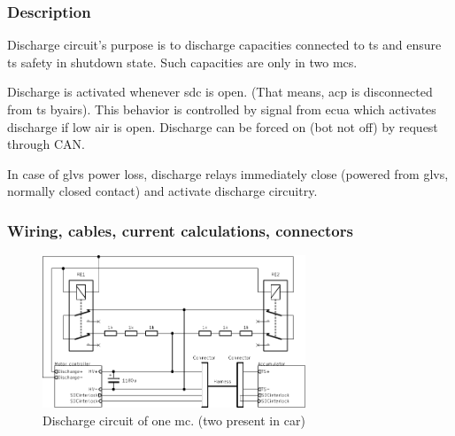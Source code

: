 \subsubsection{Description}

Discharge circuit's purpose is to discharge capacities connected to \gls{ts} and ensure \gls{ts} safety in shutdown state. Such capacities are only in two \glspl{mc}.

Discharge is activated whenever \gls{sdc} is open. (That means, \gls{acp} is disconnected from \gls{ts} by\glspl{air}). This behavior is controlled by signal from \gls{ecua} which activates discharge if low \gls{air} is open. Discharge can be forced on (bot not off) by request through CAN. 

In case of \gls{glvs} power loss, discharge relays immediately close (powered from \gls{glvs}, normally closed contact) and activate discharge circuitry.

\subsubsection{Wiring, cables, current calculations, connectors}

\begin{figure}[H]
	\centering
	\includegraphics[width=0.7\textwidth]{./img/MC_discharge.pdf}
	\caption{Discharge circuit of one \gls{mc}. (two present in car)}
	\label{fig:discharge-circuit}
\end{figure}

